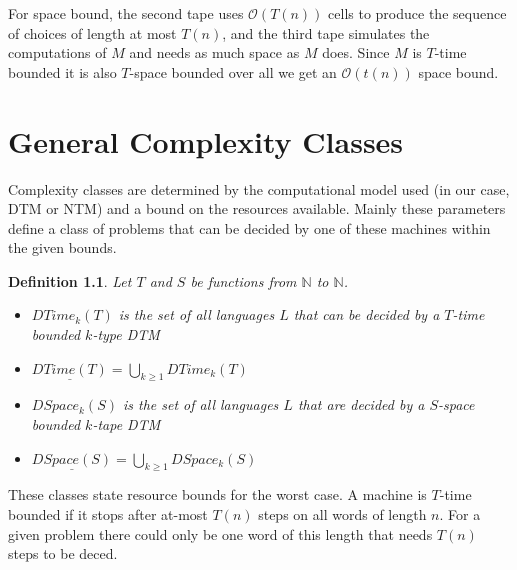 \documentclass{report}
\newtheorem{definition}{Definition}[chapter]
\begin{document}
For space bound, the second tape uses $\mathcal{O}(T(n))$ cells to produce the sequence of choices of length at most $T(n)$, and the third tape simulates the computations of $M$ and needs as much space as $M$ does. Since $M$ is $T$-time bounded it is also $T$-space bounded over all we get an $\mathcal{O}(t(n))$ space bound.


\chapter{General Complexity Classes}\label{sec:complexity-classes}
Complexity classes are determined by the computational model used (in our case, DTM or NTM) and a bound on the resources available. Mainly these parameters define a class of problems that can be decided by one of these machines within the given bounds.

\begin{definition}Let $T$ and $S$ be functions from $\mathbb{N}$ to $\mathbb{N}$.
\begin{itemize}
\item[-] \underline{$DTime_k(T)$} is the set of all languages $L$ that can be decided by a $T$-time bounded $k$-type DTM
\item[-] $\underline{DTime(T)} = \bigcup_{k\geq1}DTime_k(T)$
\item[-] \underline{$DSpace_k(S)$} is the set of all languages $L$ that are decided by a $S$-space bounded $k$-tape DTM
\item[-] $\underline{DSpace(S)} = \bigcup_{k\geq1}DSpace_k(S)$
\end{itemize}
\end{definition}
These classes state resource bounds for the worst case. A machine is $T$-time bounded if it stops after at-most $T(n)$ steps on all words of length $n$. For a given problem there could only be one word of this length that needs $T(n)$ steps to be deced.
\end{document}
